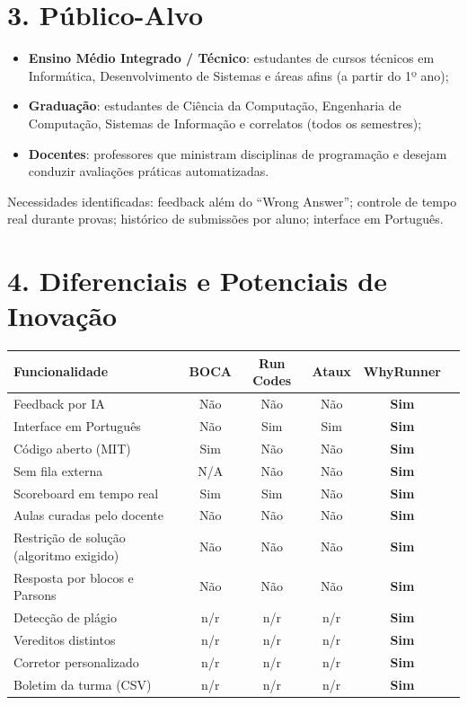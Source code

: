 \documentclass[12pt]{article}
\begin{document}
\section*{3. Público-Alvo}

\begin{itemize}[nosep]
  \item \textbf{Ensino Médio Integrado / Técnico}: estudantes de cursos técnicos
        em Informática, Desenvolvimento de Sistemas e áreas afins (a partir do
        1º ano);
  \item \textbf{Graduação}: estudantes de Ciência da Computação, Engenharia de
        Computação, Sistemas de Informação e correlatos (todos os semestres);
  \item \textbf{Docentes}: professores que ministram disciplinas de programação
        e desejam conduzir avaliações práticas automatizadas.
\end{itemize}

Necessidades identificadas: feedback além do ``Wrong Answer''; controle de
tempo real durante provas; histórico de submissões por aluno; interface em
Português.

\section*{4. Diferenciais e Potenciais de Inovação}

\begin{center}
\begin{tabular}{lccccc}
\toprule
\textbf{Funcionalidade} & \textbf{BOCA} & \textbf{Run Codes} & \textbf{Ataux} & \textbf{WhyRunner} \\
\midrule
Feedback por IA            & Não & Não & Não & \textbf{Sim} \\
Interface em Português     & Não & Sim & Sim & \textbf{Sim} \\
Código aberto (MIT)        & Sim & Não & Não & \textbf{Sim} \\
Sem fila externa           & N/A & Não & Não & \textbf{Sim} \\
Scoreboard em tempo real   & Sim & Sim & Não & \textbf{Sim} \\
Aulas curadas pelo docente & Não & Não & Não & \textbf{Sim} \\
Restrição de solução (algoritmo exigido) & Não & Não & Não & \textbf{Sim} \\
Resposta por blocos e Parsons & Não & Não & Não & \textbf{Sim} \\
Detecção de plágio         & n/r & n/r & n/r & \textbf{Sim} \\
Vereditos distintos        & n/r & n/r & n/r & \textbf{Sim} \\
Corretor personalizado     & n/r & n/r & n/r & \textbf{Sim} \\
Boletim da turma (CSV)     & n/r & n/r & n/r & \textbf{Sim} \\
\bottomrule
\end{tabular}
\end{center}
\end{document}
